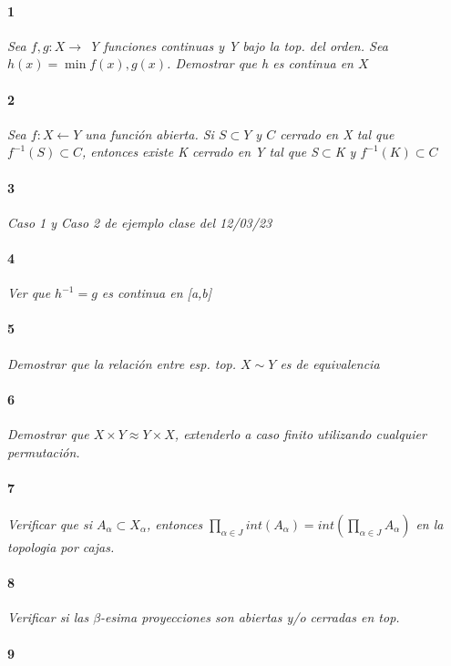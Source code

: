 \documentclass[12pt]{article}
\author{Alumnos: \\Arturo Rodriguez Contreras - 2132880 \\
Jonathan Raymundo Torres Cardenas - 1949731\\
Praxedis Jimenes Ruvalcaba \\
Erick Román Montemayor Treviño - 1957959 \\
Alexis Noe Mora Leyva \\
Everardo Flores Rivera - 2127301}
\begin{document}
\maketitle

\paragraph{1}
\textit{Sea $f,g:X\rightarrow$ Y funciones continuas y Y bajo la top. del orden. Sea $h(x)=\min{f(x),g(x)}$. Demostrar que h es continua en $X$}

\paragraph{2}
\textit{Sea $f:X\leftarrow Y$ una función abierta. Si $S \subset Y$ y $C$ cerrado en X tal que $f^{-1}(S)\subset C$, entonces existe K cerrado en Y tal que S$\subset$K y $f^{-1}(K)\subset C$}

\paragraph{3}
\textit{Caso 1 y Caso 2 de ejemplo clase del 12/03/23} 


\paragraph{4}
\textit{Ver que $h^{-1}=g$ es continua en [a,b]}

\paragraph{5}
\textit{Demostrar que la relación entre esp. top. $X\sim Y$ es de equivalencia}

\paragraph{6}
\textit{Demostrar que $X\times Y \approx Y \times X$, extenderlo a caso finito utilizando cualquier permutación.}

\paragraph{7}
\textit{Verificar que si $A_{\alpha}\subset X_{\alpha}$, entonces $\prod\limits_{\alpha\in J } int(A_{\alpha}) = int(\prod\limits_{\alpha\in J }A_{\alpha})$ en la topologia por cajas.}

\paragraph{8}
\textit{Verificar si las $\beta$-esima proyecciones son abiertas y/o cerradas en top.}

\paragraph{9}
\end{document}
